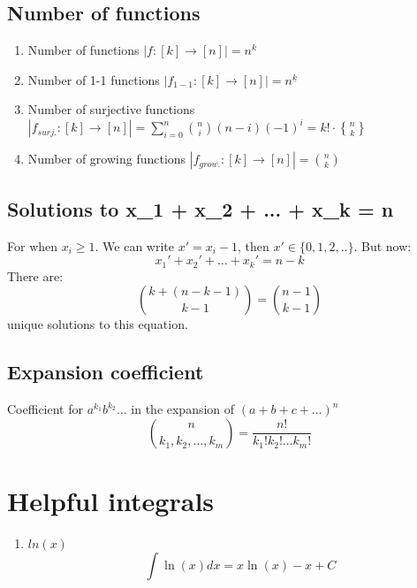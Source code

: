 \documentclass{article}
\begin{document}
\subsection{Number of functions}

\begin{enumerate}
    \item Number of functions \(|f:[k]\rightarrow[n]| = n^k\) 
    \item Number of 1-1 functions \(|f_{1-1}:[k]\rightarrow[n]| = n^{\underline{k}}\)
    \item Number of surjective functions \(|f_{surj.}:[k]\rightarrow[n]| = \sum_{i=0}^{n} \binom{n}{i} (n-i) (-1)^{i} = k! \cdot \genfrac\{\}{0pt}{1}{n}{k}\)
    \item Number of growing functions \(|f_{grow.}:[k]\rightarrow[n]| = \binom{n}{k}\)
\end{enumerate}

\subsection{Solutions to x_1 + x_2 + ... + x_k = n}

For when $x_i\geq 1$. We can write $x' = x_i -1$, then $x' \in \{0,1,2,..\}$. But now:
\[
x_1' + x_2' + \dots + x_k' = n-k
\]
There are:
\[
\binom{k+(n-k-1)}{k-1} = \binom{n-1}{k-1}
\]
unique solutions to this equation.

\subsection{Expansion coefficient}

Coefficient for $a^{k_1} b^{k_2} \dots $ in the expansion of $(a+b+c+\dots)^n$
\[
\binom{n}{k_1, k_2, \dots, k_m} = \frac{n!}{k_1! k_2! \dots k_m!}
\]

\section{Helpful integrals}

\begin{enumerate}
    \item \(ln(x)\) \[\int \ln(x) dx = x\ln(x) - x + C\]
\end{enumerate}
\end{document}

